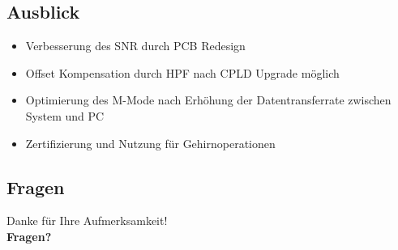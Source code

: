 \documentclass{beamer}
\begin{document}
\subsection{Ausblick}
\begin{frame}
\begin{itemize}
	\item Verbesserung des SNR durch PCB Redesign
	\item Offset Kompensation durch HPF nach CPLD Upgrade möglich
	\item Optimierung des M-Mode nach Erhöhung der Datentransferrate zwischen System und PC
	\item Zertifizierung und Nutzung für Gehirnoperationen
\end{itemize}
\end{frame}

\subsection*{Fragen}
\begin{frame}
Danke für Ihre Aufmerksamkeit!\\
\textbf{Fragen?}
\end{frame}
\end{document}
